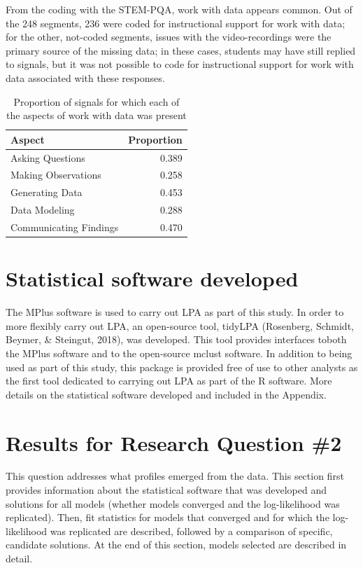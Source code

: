 \documentclass[]{msu-thesis}
\theoremstyle{definition}
\theoremstyle{definition}
\theoremstyle{definition}
\theoremstyle{remark}
\begin{document}
From the coding with the STEM-PQA, work with data appears common. Out of
the 248 segments, 236 were coded for instructional support for work with
data; for the other, not-coded segments, issues with the
video-recordings were the primary source of the missing data; in these
cases, students may have still replied to signals, but it was not
possible to code for instructional support for work with data associated
with these responses.

\begin{table}

\caption{\label{tab:unnamed-chunk-11}Proportion of signals for which each of the aspects of work with data was present}
\centering
\begin{tabular}[t]{lr}
\toprule
Aspect & Proportion\\
\midrule
Asking Questions & 0.389\\
Making Observations & 0.258\\
Generating Data & 0.453\\
Data Modeling & 0.288\\
Communicating Findings & 0.470\\
\bottomrule
\end{tabular}
\end{table}

\section{Statistical software
developed}\label{statistical-software-developed}

The MPlus software is used to carry out LPA as part of this study. In
order to more flexibly carry out LPA, an open-source tool, tidyLPA
(Rosenberg, Schmidt, Beymer, \& Steingut, 2018), was developed. This
tool provides interfaces toboth the MPlus software and to the
open-source mclust software. In addition to being used as part of this
study, this package is provided free of use to other analysts as the
first tool dedicated to carrying out LPA as part of the R software. More
details on the statistical software developed and included in the
Appendix.

\section{Results for Research Question
\#2}\label{results-for-research-question-2}

This question addresses what profiles emerged from the data. This
section first provides information about the statistical software that
was developed and solutions for all models (whether models converged and
the log-likelihood was replicated). Then, fit statistics for models that
converged and for which the log-likelihood was replicated are described,
followed by a comparison of specific, candidate solutions. At the end of
this section, models selected are described in detail.
\end{document}
